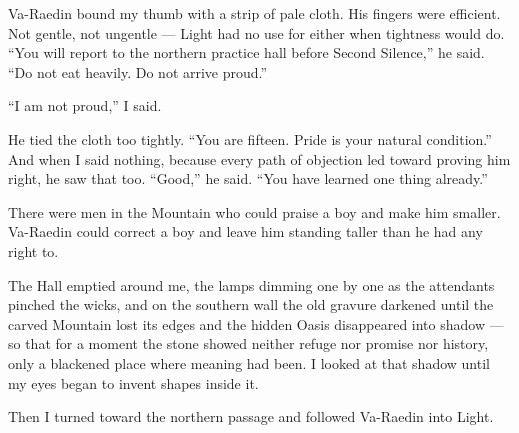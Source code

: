 Va-Raedin bound my thumb with a strip of pale cloth. 
His fingers were efficient. 
Not gentle, not ungentle --- Light had no use for either when tightness would do. ``You will report to the northern practice hall before Second Silence,'' he said. 
``Do not eat heavily. Do not arrive proud.''\par

``I am not proud,'' I said.\par

He tied the cloth too tightly. 
``You are fifteen. Pride is your natural condition.'' 
And when I said nothing, because every path of objection led toward proving him right, he saw that too. 
``Good,'' he said. 
``You have learned one thing already.''\par

There were men in the Mountain who could praise a boy and make him smaller. 
Va-Raedin could correct a boy and leave him standing taller than he had any right to.\par

The Hall emptied around me, the lamps dimming one by one as the attendants pinched the wicks, and on the southern wall the old gravure darkened until the carved 
Mountain lost its edges and the hidden Oasis disappeared into shadow --- so that for a moment the stone showed neither refuge nor promise nor history, 
only a blackened place where meaning had been. 
I looked at that shadow until my eyes began to invent shapes inside it.\par

Then I turned toward the northern passage and followed Va-Raedin into Light.\par

\ornament
